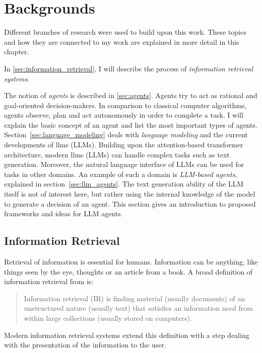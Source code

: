 \documentclass[../main.tex]{subfiles}
\begin{document}
\chapter{Backgrounds}
\label{ch:backgrounds}

Different branches of research were used to build upon this work.
These topics and how they are connected to my work
are explained in more detail in this chapter.

In \autoref{sec:information_retrieval},
I will describe the process of \emph{information retrieval systems}.

The notion of \emph{agents} is described in \autoref{sec:agents}.
Agents try to act as rational and goal-oriented decision-makers.
In comparison to classical computer algorithms,
agents observe, plan and act autonomously in order to complete a task.
I will explain the basic concept of an agent and list the most important types of agents.
Section~\ref{sec:language_modeling} deals with \emph{language modeling}
and the current developments of \glspl{llm} (LLMs).
Building upon the attention-based transformer architecture, modern \glspl{llm} (LLMs)
can handle complex tasks such as text generation.
Moreover, the natural language interface of LLMs can be used for tasks in other domains.
An example of such a domain is \emph{LLM-based agents}, explained in section~\ref{sec:llm_agents}.
The text generation ability of the LLM itself is not of interest here,
but rather using the internal knowledge of the model to generate a decision of an agent.
This section gives an introduction to proposed frameworks and ideas for LLM agents.

\section{Information Retrieval}
\label{sec:information_retrieval}
Retrieval of information is essential for humans.
Information can be anything, like things seen by the eye,
thoughts or an article from a book.
A broad definition of information retrieval from \cite{Manning2009} is:
\begin{quote}
    Information retrieval (IR) is finding material (usually documents)
    of an unstructured nature (usually text)
    that satisfies an information need
    from within large collections (usually stored on computers).
\end{quote}
Modern information retrieval systems extend this definition with a step
dealing with the presentation of the information to the user.
\end{document}
